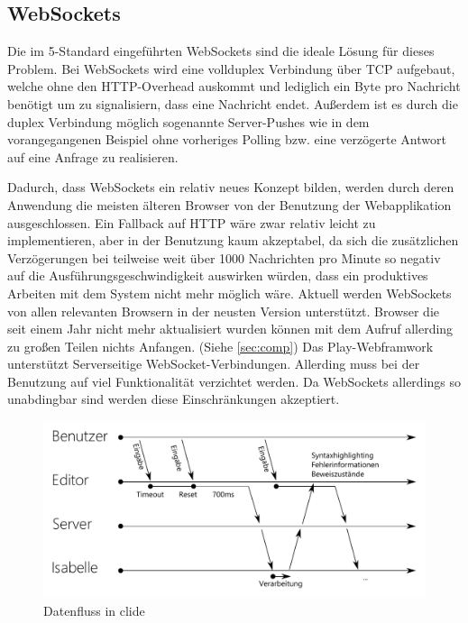 \subsection{WebSockets}
\label{sec:ws}

Die im 5-Standard eingeführten WebSockets sind die ideale Lösung für dieses Problem. Bei
WebSockets wird eine vollduplex Verbindung über TCP aufgebaut, welche ohne den HTTP-Overhead
auskommt und lediglich ein Byte pro Nachricht benötigt um zu signalisiern, dass eine Nachricht
endet. Außerdem ist es durch die duplex Verbindung möglich sogenannte Server-Pushes wie in dem
vorangegangenen Beispiel ohne vorheriges Polling bzw. eine verzögerte Antwort auf eine Anfrage zu
realisieren.

Dadurch, dass WebSockets ein relativ neues Konzept bilden, werden durch deren Anwendung die meisten
älteren Browser von der Benutzung der Webapplikation ausgeschlossen. Ein Fallback auf HTTP wäre zwar
relativ leicht zu implementieren, aber in der Benutzung kaum akzeptabel, da sich die zusätzlichen
Verzögerungen bei teilweise weit über 1000 Nachrichten pro Minute so negativ auf die
Ausführungsgeschwindigkeit auswirken würden, dass ein produktives Arbeiten mit dem System nicht mehr
möglich wäre. Aktuell werden WebSockets von allen relevanten Browsern in der neusten Version
unterstützt. Browser die seit einem Jahr nicht mehr aktualisiert wurden können mit dem Aufruf
allerding zu großen Teilen nichts Anfangen. (Siehe \ref{sec:comp}) Das Play-Webframwork unterstützt
Serverseitige WebSocket-Verbindungen. Allerding muss bei der Benutzung auf viel Funktionalität
verzichtet werden. Da WebSockets allerdings so unabdingbar sind werden diese Einschränkungen
akzeptiert.

\begin{figure}[ht]
\includegraphics[width=\linewidth]{images/diagram-workflow}
  \caption{Datenfluss in clide}  
  \label{fig:diagram-workflow}
\end{figure}

